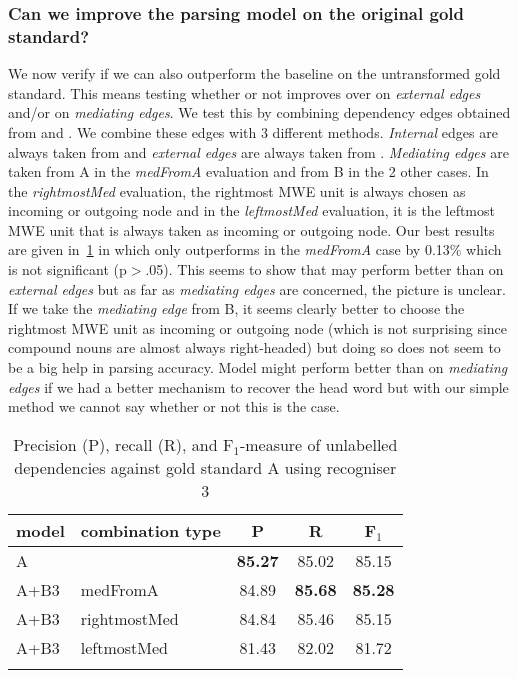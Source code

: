 \documentclass[output=paper]{langsci/langscibook}
\begin{document}
\subsubsection{Can we improve the parsing model on the original gold standard?}
\indent We now verify if we can also outperform the baseline on the untransformed gold standard. This means testing whether or not {\modelB} improves over {\modelA} on \textit{external edges} and/or on \textit{mediating edges}. We test this by combining dependency edges obtained from {\modelA} and {\modelB}. We combine these edges with 3 different methods. \textit{Internal} edges are always taken from {\modelA} and \textit{external edges} are always taken from {\modelB}. \textit{Mediating edges} are taken from A in the \textit{medFromA} evaluation and from B in the 2 other cases. In the \textit{rightmostMed} evaluation, the rightmost MWE unit is always chosen as incoming or outgoing node and in the \textit{leftmostMed} evaluation, it is the leftmost MWE unit that is always taken as incoming or outgoing node. Our best results are given in~\ref{del:tab:res2} in which {\modelB} only outperforms {\modelA} in the \textit{medFromA} case by 0.13\% which is not significant (p$>$.05). This seems to show that {\modelB} may perform better than {\modelA} on \textit{external edges} but as far as \textit{mediating edges} are concerned, the picture is unclear. If we take the \textit{mediating edge} from B, it seems clearly better to choose the rightmost MWE unit as incoming or outgoing node (which is not surprising since compound nouns are almost always right-headed) but doing so does not seem to be a big help in parsing accuracy. Model might perform better than {\modelA} on \textit{mediating edges} if we had a better mechanism to recover the head word but with our simple method we cannot say whether or not this is the case.

\begin{table}[h]
    \footnotesize
    \def\arraystretch{1.20} 
    \centering
    \begin{tabular}{l l c c c} %
      \lsptoprule
        \textnormal{model}
        & \textnormal{combination type}
        & \textnormal{P}
        & \textnormal{R}
        & \textnormal{F$_1$}
        \\ %
        \midrule
        A & & \textbf{85.27} & 85.02 & 85.15\\
        A+B3 & medFromA &84.89  &\textbf{85.68} & \textbf{85.28} \\
        A+B3 & rightmostMed &84.84  &85.46  & 85.15 \\
        A+B3 & leftmostMed &81.43  &82.02  & 81.72 \tabularnewline %
        \lspbottomrule
    \end{tabular}
    \caption{Precision (P), recall (R), and F$_1$-measure of unlabelled dependencies against gold standard A using recogniser 3\label{del:tab:res2}}
\end{table}
\end{document}
